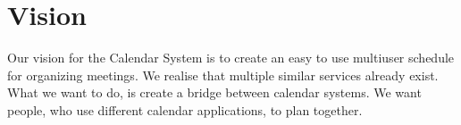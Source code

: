 \section{Vision}
Our vision for the Calendar System is to create an easy to use multiuser
schedule for organizing meetings. We realise that multiple similar services
already exist. What we want to do, is create a bridge between calendar systems. We want people, who use different calendar applications, to plan together.
\newpage
